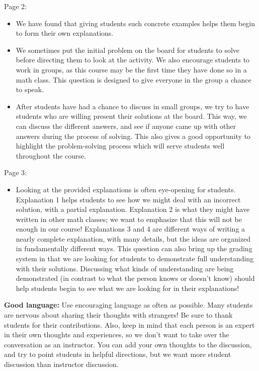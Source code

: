 \documentclass[noauthor,nooutcomes]{ximera}
\begin{document}
\begin{instructorNotes}
Page 2:
\begin{itemize}
\item   We have found that giving students such concrete examples helps them begin to form their own explanations.


\item We sometimes put the initial problem on the board for students to solve before directing them to look at the activity.  We also encourage students to work in groups, as this course may be the first time they have done so in a math class.  This question is designed to give everyone in the group a chance to speak.

\item After students have had a chance to discuss in small groups, we try to have students who are willing present their solutions at the board.  This way, we can discuss the different answers, and see if anyone came up with other answers during the process of solving.  This also gives a good opportunity to highlight the problem-solving process which will serve students well throughout the course.
\end{itemize}

Page 3:
\begin{itemize}
\item 
Looking at the provided explanations is often eye-opening for students.  Explanation 1 helps students to see how we might deal with an incorrect solution, with a partial explanation.  Explanation 2 is what they might have written in other math classes; we want to emphasize that this will not be enough in our course!  Explanations 3 and 4 are different ways of writing a nearly complete explanation, with many details, but the ideas are organized in fundamentally different ways.  This question can also bring up the grading system in that we are looking for students to demonstrate full understanding with their solutions. Discussing what kinds of understanding are being demonstrated (in contrast to what the person knows or doesn't know) should help students begin to see what we are looking for in their explanations!
\end{itemize}


{\bf Good language:}                                                                                                                                                   
Use encouraging language as often as possible. Many students are nervous about sharing their thoughts with strangers! Be sure to thank students for their contributions. Also, keep in mind that each person is an expert in their own thoughts and experiences, so we don't want to take over the conversation as an instructor. You can add your own thoughts to the discussion, and try to point students in helpful directions, but we want more student discussion than instructor discussion.







\end{instructorNotes}
\end{document}
